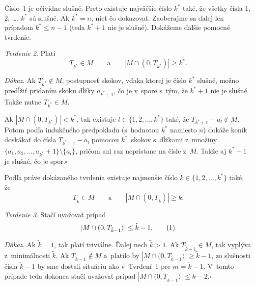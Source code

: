 {Číslo~$1$ je očividne slušné. Preto existuje najväčšie číslo $k^*$ také, že všetky čísla $1$, $2$, \dots, $k^*$ sú slušné. Ak $k^*=n$, niet čo dokazovať. Zaoberajme sa ďalej len prípadom $k^*\le n-1$ (teda $k^*+1$ nie je slušné). Dokážeme ďalšie pomocné tvrdenie.

\smallskip\noindent
{\it Tvrdenie 2}.
Platí
$$
T_{k^*}\in M \qquad\text{a}\qquad |M\cap(0,T_{k^*})|\ge k^*.
$$

\smallskip\noindent
{\it Dôkaz}.
Ak $T_{k^*}\notin M$, postupnosť skokov, vďaka ktorej je číslo $k^*$ slušné, možno predĺžiť pridaním skoku dĺžky $a_{k^*+1}$, čo je v~spore s~tým, že $k^*+1$ nie je slušné. Takže nutne $T_{k^*}\in M$.

Ak $|M\cap(0,T_{k^*})|<k^*$, tak existuje $l\in\{1,2,\dots,k^*\}$ také, že $T_{k^*+1}-a_l\notin M$. Potom podľa indukčného predpokladu (s~hodnotou $k^*$ namiesto $n$) dokáže koník doskákať do čísla $T_{k^*+1}-a_l$ pomocou $k^*$~skokov s~dĺžkami z~množiny $\{a_1,a_2,\dots,{a_{k^*}+1}\}\setminus\{a_l\}$, pričom ani raz nepristane na čísle z~$M$. Takže aj $k^*+1$ je slušné, čo je spor.\hfill$\square$

\smallskip
Podľa práve dokázaného tvrdenia existuje najmenšie číslo $\tilde k\in\{1,2,\dots,k^*\}$ také, že
$$
T_{\tilde k}\in M\qquad\text{a}\qquad |M\cap(0,T_{\tilde k})|\ge\tilde k.
$$

\smallskip\noindent
{\it Tvrdenie 3}.
Stačí uvažovať prípad
$$
|M\cap(0,T_{\tilde k-1}\rangle|\le \tilde k-1.
\tag1
$$

\smallskip\noindent
{\it Dôkaz}.
Ak $\tilde k=1$, tak  platí triviálne. Ďalej nech $\tilde k>1$. Ak $T_{\tilde k-1}\in M$, tak  vyplýva z~minimálnosti $\tilde k$. Ak $T_{\tilde k-1}\notin M$ a~platilo by $|M\cap(0,T_{\tilde k-1}\rangle|\ge \tilde k-1$, zo slušnosti čísla $\tilde k-1$ by sme dostali situáciu ako v~Tvrdení~1 pre $m=\tilde k-1$. V~tomto prípade teda dokonca stačí uvažovať prípad $|M\cap(0,T_{\tilde k-1}\rangle|\le \tilde k-2$.\hfill$\square$

}
